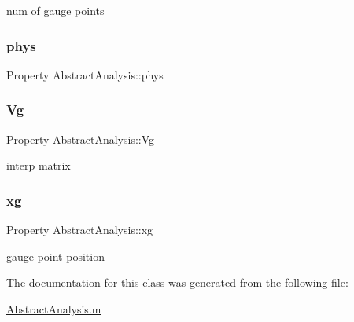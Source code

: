 num of gauge points 

\mbox{\label{class_abstract_analysis_aa0d0d19a77f93d3ad8d25f4812d0b42f}} 
\subsubsection{\texorpdfstring{phys}{phys}}
{\footnotesize\ttfamily Property Abstract\+Analysis\+::phys}

\mbox{\label{class_abstract_analysis_a4e9418dfd5f4564c5b78179a0fb6e1bb}} 
\subsubsection{\texorpdfstring{Vg}{Vg}}
{\footnotesize\ttfamily Property Abstract\+Analysis\+::\+Vg\hspace{0.3cm}{\ttfamily [protected]}}



interp matrix 

\mbox{\label{class_abstract_analysis_abaf0926252e93facb0590298a27f0ae6}} 
\subsubsection{\texorpdfstring{xg}{xg}}
{\footnotesize\ttfamily Property Abstract\+Analysis\+::xg\hspace{0.3cm}{\ttfamily [protected]}}



gauge point position 



The documentation for this class was generated from the following file\+:\begin{DoxyCompactItemize}
\item 
\hyperlink{_abstract_analysis_8m}{Abstract\+Analysis.\+m}\end{DoxyCompactItemize}
